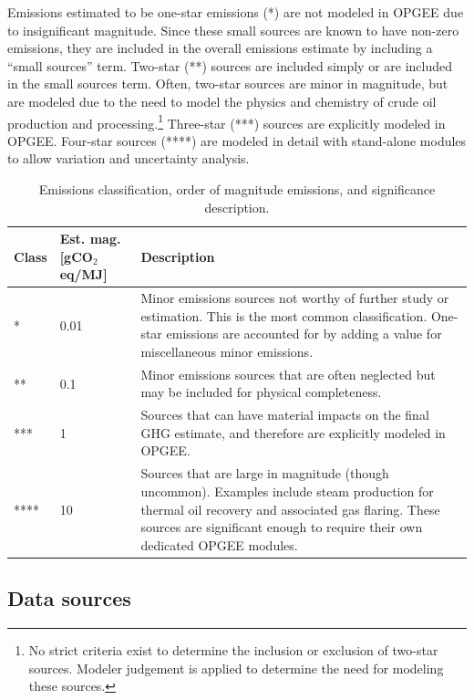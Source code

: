 \documentclass[11pt]{report}
\begin{document}
Emissions estimated to be one-star emissions (*) are not modeled in OPGEE due to insignificant magnitude. Since these small sources are known to have non-zero emissions, they are included in the overall emissions estimate by including a ``small sources'' term.  Two-star (**) sources are included simply or are included in the small sources term. Often, two-star sources are minor in magnitude, but are modeled due to the need to model the physics and chemistry of crude oil production and processing.\footnote{No strict criteria exist to determine the inclusion or exclusion of two-star sources. Modeler judgement is applied to determine the need for modeling these sources.} Three-star (***) sources are explicitly modeled in OPGEE. Four-star sources (****) are modeled in detail with stand-alone modules to allow variation and uncertainty analysis. 

\begin{table}
\begin{scriptsize}
\caption{Emissions classification, order of magnitude emissions, and significance description.}
\label{tab:emissions_significance}
\begin{tabular}{p{}p{}p{}}
\toprule
Class & Est. mag. [gCO$_2$eq/MJ] & Description \\
\midrule
* & 0.01 & Minor emissions sources not worthy of further study or estimation. This is the most common classification. One-star emissions are accounted for by adding a value for miscellaneous minor emissions.\\
** & 0.1 & Minor emissions sources that are often neglected but may be included for physical completeness.\\
*** & 1 & Sources that can have material impacts on the final GHG estimate, and therefore are explicitly modeled in OPGEE. \\
**** & 10 & Sources that are large in magnitude (though uncommon). Examples include steam production for thermal oil recovery and associated gas flaring. These sources are significant enough to require their own dedicated OPGEE modules.\\
\bottomrule 
\end{tabular}
\end{scriptsize}
\end{table}


\subsection{Data sources}
\end{document}
